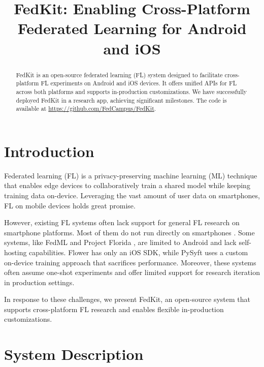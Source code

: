 \documentclass[letterpaper]{article} %
\title{FedKit: Enabling Cross-Platform Federated Learning for Android and iOS}
\author{}
\begin{document}
\maketitle

\begin{abstract}
    FedKit is an open-source federated learning (FL) system designed to
    facilitate cross-platform FL experiments on Android and iOS devices.
    It offers unified APIs for FL across both platforms and
    supports in-production customizations.
    We have successfully deployed FedKit in a research app,
    achieving significant milestones.
    The code is available at \url{https://github.com/FedCampus/FedKit}.
\end{abstract}

\section{Introduction}

Federated learning (FL) is a privacy-preserving machine learning (ML) technique
that enables edge devices to collaboratively train a shared model while
keeping training data on-device.
Leveraging the vast amount of user data on smartphones,
FL on mobile devices holds great promise.

However, existing FL systems often lack support for general FL research on
smartphone platforms.
Most of them do not run directly on smartphones
\cite[e.g.,][]{bonawitz2019towards,liu2021fate,ma2019paddlepaddle,openfl_citation}.
Some systems, like FedML \cite{he2020fedml} and
Project Florida \cite{madrigal2023project},
are limited to Android and lack self-hosting capabilities.
Flower \cite{beutel2020flower,mathur2021ondevice} has only an iOS SDK,
while PySyft \cite{ryffel2018generic,Ziller2021,hall2021syft} uses
a custom on-device training approach that sacrifices performance.
Moreover, these systems often assume one-shot experiments and
offer limited support for research iteration in production settings.

In response to these challenges, we present FedKit,
an open-source system that supports cross-platform FL research and
enables flexible in-production customizations.

\section{System Description}
\end{document}
